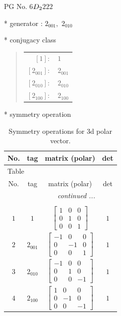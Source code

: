 \documentclass[fleqn,8pt]{jsarticle}
\begin{document}
\setcounter{MaxMatrixCols}{32}

\renewcommand{\tablename}{Table~}
\renewcommand{\figurename}{Figure~}
\begin{center}
\LARGE
PG No. 6\quad$D_{\rm 2}$\quad$222$\quad[ orthorhombic ]
\end{center}

* generator : $2{}_{001},\,\,2{}_{010}$

* conjugacy class
\begin{quote}
\begin{tabular}{rl}
$ [1]: $ & $ 1 $ \\
$ [2{}_{001}]: $ & $ 2{}_{001} $ \\
$ [2{}_{010}]: $ & $ 2{}_{010} $ \\
$ [2{}_{100}]: $ & $ 2{}_{100} $
\end{tabular}
\end{quote}

* symmetry operation
\renewcommand{\arraystretch}{1.3}
\begin{longtable}{cccc}
\caption{Symmetry operations for 3d polar vector.}
 \\
 \hline \hline
No. & tag & matrix (polar) & det \\ \hline \endfirsthead

\multicolumn{3}{l}{\tablename\ \thetable{}} \\
 \hline \hline
No. & tag & matrix (polar) & det \\ \hline \endhead

 \hline \hline
\multicolumn{3}{r}{\footnotesize\it continued ...} \\ \endfoot

 \hline \hline
\multicolumn{3}{r}{} \\ \endlastfoot

$ 1 $ & $ 1 $ & $ \begin{bmatrix} 1 & 0 & 0 \\ 0 & 1 & 0 \\ 0 & 0 & 1 \end{bmatrix} $ & $ 1 $ \\ \hline
$ 2 $ & $ 2{}_{001} $ & $ \begin{bmatrix} -1 & 0 & 0 \\ 0 & -1 & 0 \\ 0 & 0 & 1 \end{bmatrix} $ & $ 1 $ \\ \hline
$ 3 $ & $ 2{}_{010} $ & $ \begin{bmatrix} -1 & 0 & 0 \\ 0 & 1 & 0 \\ 0 & 0 & -1 \end{bmatrix} $ & $ 1 $ \\ \hline
$ 4 $ & $ 2{}_{100} $ & $ \begin{bmatrix} 1 & 0 & 0 \\ 0 & -1 & 0 \\ 0 & 0 & -1 \end{bmatrix} $ & $ 1 $ \\
\end{longtable}
\end{document}
